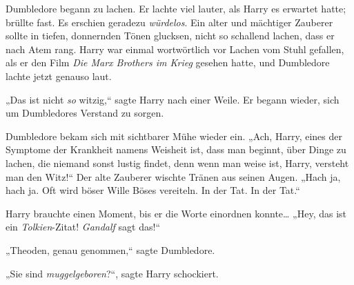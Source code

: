 Dumbledore begann zu lachen. Er lachte viel lauter, als Harry es erwartet hatte; brüllte fast. Es erschien geradezu \emph{würdelos}. Ein alter und mächtiger Zauberer sollte in tiefen, donnernden Tönen glucksen, nicht so schallend lachen, dass er nach Atem rang. Harry war einmal wortwörtlich vor Lachen vom Stuhl gefallen, als er den Film \emph{Die Marx Brothers im Krieg} gesehen hatte, und Dumbledore lachte jetzt genauso laut.

„Das ist nicht \emph{so} witzig,“ sagte Harry nach einer Weile. Er begann wieder, sich um Dumbledores Verstand zu sorgen.

Dumbledore bekam sich mit sichtbarer Mühe wieder ein. „Ach, Harry, eines der Symptome der Krankheit namens Weisheit ist, dass man beginnt, über Dinge zu lachen, die niemand sonst lustig findet, denn wenn man weise ist, Harry, versteht man den Witz!“ Der alte Zauberer wischte Tränen aus seinen Augen. „Hach ja, hach ja. Oft wird böser Wille Böses vereiteln. In der Tat. In der Tat.“

Harry brauchte einen Moment, bis er die Worte einordnen konnte… „Hey, das ist ein \emph{Tolkien}-Zitat! \emph{Gandalf} sagt das!“

„Theoden, genau genommen,“ sagte Dumbledore.

„Sie sind \emph{muggelgeboren}?“, sagte Harry schockiert.

